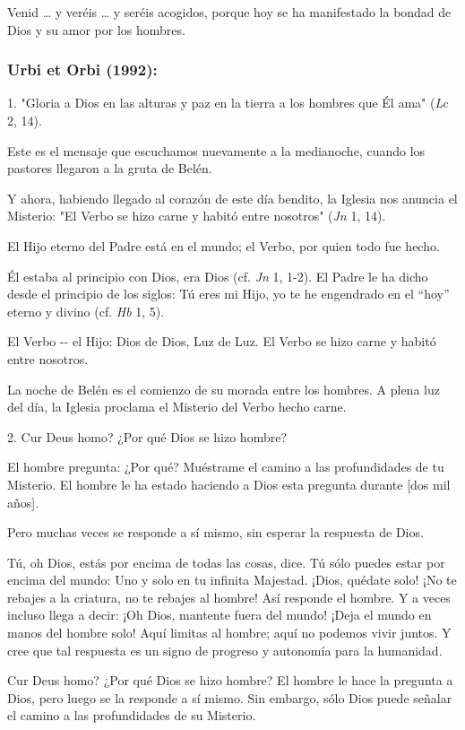Venid \ldots{} y veréis \ldots{} y seréis acogidos, porque hoy se ha
manifestado la bondad de Dios y su amor por los hombres.

\subsubsection{Urbi et Orbi (1992): }

1. "Gloria a Dios en las alturas y paz en la tierra a los hombres que Él
ama" (\emph{Lc} 2, 14).

Este es el mensaje que escuchamos nuevamente a la medianoche, cuando los
pastores llegaron a la gruta de Belén.

Y ahora, habiendo llegado al corazón de este día bendito, la Iglesia nos
anuncia el Misterio: "El Verbo se hizo carne y habitó entre nosotros"
(\emph{Jn} 1, 14).

El Hijo eterno del Padre está en el mundo; el Verbo, por quien todo fue
hecho.

Él estaba al principio con Dios, era Dios (cf. \emph{Jn} 1, 1-2). El
Padre le ha dicho desde el principio de los siglos: Tú eres mi Hijo, yo
te he engendrado en el ``hoy'' eterno y divino (cf. \emph{Hb} 1, 5).

El Verbo -\/- el Hijo: Dios de Dios, Luz de Luz. El Verbo se hizo carne
y habitó entre nosotros.

La noche de Belén es el comienzo de su morada entre los hombres. A plena
luz del día, la Iglesia proclama el Misterio del Verbo hecho carne.

2. Cur Deus homo? ¿Por qué Dios se hizo hombre?

El hombre pregunta: ¿Por qué? Muéstrame el camino a las profundidades de
tu Misterio. El hombre le ha estado haciendo a Dios esta pregunta
durante {[}dos mil años{]}.

Pero muchas veces se responde a sí mismo, sin esperar la respuesta de
Dios.

Tú, oh Dios, estás por encima de todas las cosas, dice. Tú sólo puedes
estar por encima del mundo: Uno y solo en tu infinita Majestad. ¡Dios,
quédate solo! ¡No te rebajes a la criatura, no te rebajes al hombre! Así
responde el hombre. Y a veces incluso llega a decir: ¡Oh Dios, mantente
fuera del mundo! ¡Deja el mundo en manos del hombre solo! Aquí limitas
al hombre; aquí no podemos vivir juntos. Y cree que tal respuesta es un
signo de progreso y autonomía para la humanidad.

Cur Deus homo? ¿Por qué Dios se hizo hombre? El hombre le hace la
pregunta a Dios, pero luego se la responde a sí mismo. Sin embargo, sólo
Dios puede señalar el camino a las profundidades de su Misterio.

